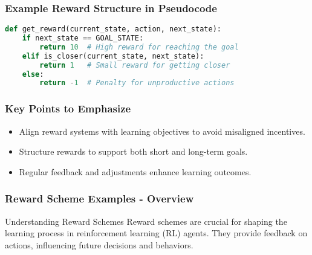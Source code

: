 \documentclass[aspectratio=169]{beamer}
\begin{document}
\begin{frame}[fragile]
    \frametitle{Example Reward Structure in Pseudocode}
    \begin{lstlisting}[language=Python]
def get_reward(current_state, action, next_state):
    if next_state == GOAL_STATE:
        return 10  # High reward for reaching the goal
    elif is_closer(current_state, next_state):
        return 1   # Small reward for getting closer
    else:
        return -1  # Penalty for unproductive actions
    \end{lstlisting}
\end{frame}

\begin{frame}[fragile]
    \frametitle{Key Points to Emphasize}
    \begin{itemize}
        \item Align reward systems with learning objectives to avoid misaligned incentives.
        \item Structure rewards to support both short and long-term goals.
        \item Regular feedback and adjustments enhance learning outcomes.
    \end{itemize}
\end{frame}

\begin{frame}[fragile]
    \frametitle{Reward Scheme Examples - Overview}
    \begin{block}{Understanding Reward Schemes}
        Reward schemes are crucial for shaping the learning process in reinforcement learning (RL) agents. They provide feedback on actions, influencing future decisions and behaviors.
    \end{block}
\end{frame}
\end{document}
